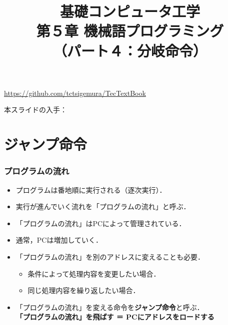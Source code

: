 \documentclass[handout]{beamer}        %
\begin{document}
\title{基礎コンピュータ工学\\第５章 機械語プログラミング\\
       （パート４：分岐命令）}
\date{}

\begin{frame}
  \titlepage
  \centerline{\url{https://github.com/tctsigemura/TecTextBook}}
  \vfill
  \centerline{本スライドの入手：
    }
\end{frame}


\section{ジャンプ命令}
\begin{frame}
  \frametitle{プログラムの流れ}
  \begin{itemize}
  \item プログラムは番地順に実行される（逐次実行）．
  \item 実行が進んでいく流れを「プログラムの流れ」と呼ぶ．
  \item 「プログラムの流れ」はPCによって管理されている．
  \item 通常，PCは増加していく．
  \item 「プログラムの流れ」を別のアドレスに変えることも必要．
    \begin{itemize}
    \item 条件によって処理内容を変更したい場合．
    \item 同じ処理内容を繰り返したい場合．
    \end{itemize}
  \item 「プログラムの流れ」を変える命令を\textbf{ジャンプ命令}と呼ぶ． \\
    \textbf{「プログラムの流れ」を飛ばす ＝ PCにアドレスをロードする}
  \end{itemize}
  \vfill
  \vfill
\end{frame}
\end{document}
